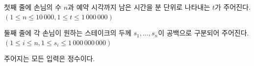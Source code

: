 첫째 줄에 손님의 수 $n$과 예약 시각까지 남은 시간을 분 단위로 나타내는 $t$가 주어진다. $(1 \le n \le 10\,000, 1 \le t \le 1\,000\,000)$

둘째 줄에 각 손님이 원하는 스테이크의 두께 $s_1, \ldots, s_n$이 공백으로 구분되어 주어진다. $(1 \le i \le n, 1 \le s_i \le 1\,000\,000\,000)$

주어지는 모든 입력은 정수이다.
